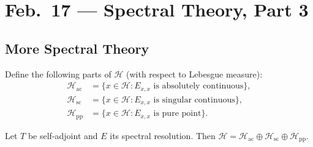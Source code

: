 \chapter{Feb.~17 --- Spectral Theory, Part 3}

\section{More Spectral Theory}

\begin{definition}
  Define the following parts of $\mathcal{H}$ (with
  respect to Lebesgue measure):
  \begin{align*}
    \mathcal{H}_{\mathrm{ac}}
    &= \{x \in \mathcal{H} : E_{x, x} \text{ is absolutely continuous}\}, \\
    \mathcal{H}_{\mathrm{sc}}
    &= \{x \in \mathcal{H} : E_{x, x} \text{ is singular continuous}\}, \\
    \mathcal{H}_{\mathrm{pp}}
    &= \{x \in \mathcal{H} : E_{x, x} \text{ is pure point}\}.
  \end{align*}
\end{definition}

\begin{lemma}
  Let $T$ be self-adjoint and $E$ its spectral
  resolution. Then
  $\mathcal{H} = \mathcal{H}_{\mathrm{ac}} \oplus \mathcal{H}_{\mathrm{sc}} \oplus \mathcal{H}_{\mathrm{pp}}$.
\end{lemma}

